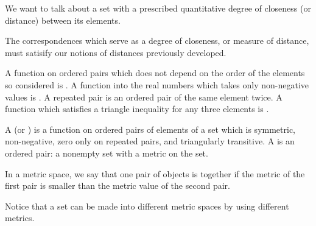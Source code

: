 
\sbasic






















\sstart
{}


We want to talk about a set
with a prescribed quantitative
degree of closeness (or distance)
between its elements.


The correspondences
which serve as a
degree of closeness,
or measure of distance, must
satisify our notions of distances
previously developed.

A function on ordered pairs which
does not depend on the order of
the elements so considered is
.
A function into the real numbers
which takes only non-negative
values is .
A repeated pair is an ordered pair
of the same element twice.
A function which satisfies
a triangle inequality for any
three elements is
.

A 
(or )
is a function
on ordered pairs of elements
of a set which
is symmetric, non-negative,
zero only on repeated pairs,
and triangularly
transitive.
A 
is an ordered
pair: a nonempty set with
a metric on the set.

In a metric space,
we say that one pair
of objects is 
together if
the metric
of the first pair
is smaller than the
metric value of the
second pair.

Notice that a set can be made into
different metric spaces by using
different metrics.


